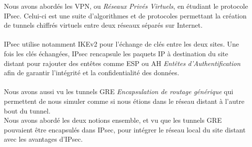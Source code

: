 Nous avons abordés les VPN, ou \textit{Réseaux Privés Virtuels}, en étudiant le protocole IPsec. Celui-ci est une suite d'algorithmes et de protocoles permettant la création de tunnels chiffrés virtuels entre deux réseaux séparés sur Internet.
\\ \\
IPsec utilise notamment IKEv2 pour l'échange de clés entre les deux sites. Une fois les clés échangées, IPsec rencapsule les paquets IP à destination du site distant pour rajouter des entêtes comme ESP ou AH \textit{Entêtes d'Authentification} afin de garantir l'intégrité et la confidentialité des données.
\\ \\
Nous avons aussi vu les tunnels GRE \textit{Encapsulation de routage générique} qui permettent de nous simuler comme si nous étions dans le réseau distant à l'autre bout du tunnel. 
\\
Nous avons abordé les deux notions ensemble, et vu que les tunnels GRE pouvaient être encapsulés dans IPsec, pour intégrer le réseau local du site distant avec les avantages d'IPsec.